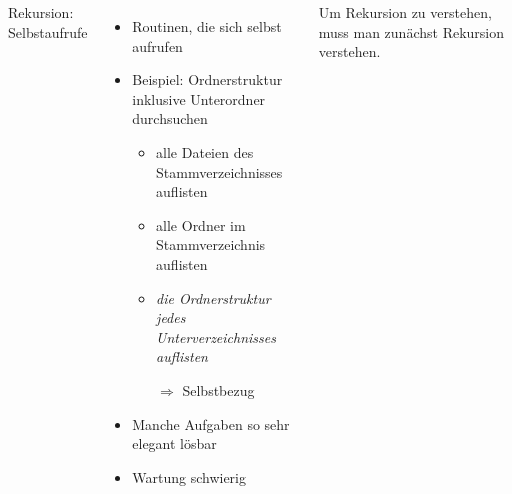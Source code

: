 \begin{frame}[t,fragile]%
%
\begin{columns}[T]
\begin{Large}
Rekursion: Selbstaufrufe
\vspace{10pt}
\end{Large}
%
\begin{itemize}
\item Routinen, die sich selbst aufrufen
\item Beispiel: Ordnerstruktur inklusive Unterordner durchsuchen
	\begin{itemize}
	\item alle Dateien des Stammverzeichnisses auflisten
	\item alle Ordner im Stammverzeichnis auflisten
	\item \emph{die Ordnerstruktur jedes Unterverzeichnisses auflisten}
	\item[$\Rightarrow$] Selbstbezug
	\end{itemize}
\item Manche Aufgaben so sehr elegant lösbar
\item Wartung schwierig
\end{itemize}
%
\begin{hintbox}
\footnotesize Um Rekursion zu verstehen, muss man zunächst Rekursion verstehen.
\end{hintbox}
%

\end{columns}
\end{frame}
